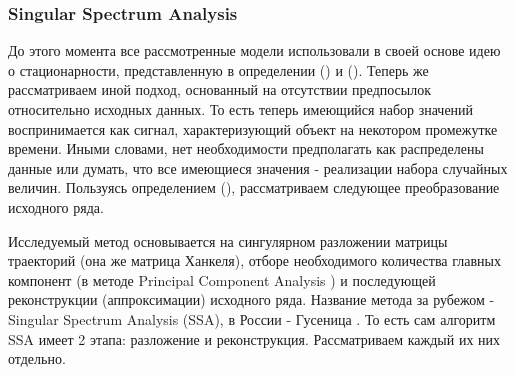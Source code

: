 \subsubsection{Singular Spectrum Analysis}
До этого момента все рассмотренные модели использовали в своей основе идею о стационарности, представленную в определении () и (). Теперь же рассматриваем иной подход, основанный на отсутствии предпосылок относительно исходных данных. То есть теперь имеющийся набор значений воспринимается как сигнал, характеризующий объект на некотором промежутке времени. Иными словами, нет необходимости предполагать как распределены данные или думать, что все имеющиеся значения - реализации набора случайных величин. Пользуясь определением (), рассматриваем следующее преобразование исходного ряда.

Исследуемый метод основывается на сингулярном разложении матрицы траекторий (она же матрица Ханкеля), отборе необходимого количества главных компонент (в методе Principal Component Analysis \cite{abdi2010pca}) и последующей реконструкции (аппроксимации) исходного ряда. Название метода за рубежом - Singular Spectrum Analysis (SSA), в России - Гусеница \cite{catarpillar_ssa}. То есть сам алгоритм SSA имеет 2 этапа: разложение и реконструкция. Рассматриваем каждый их них отдельно.

